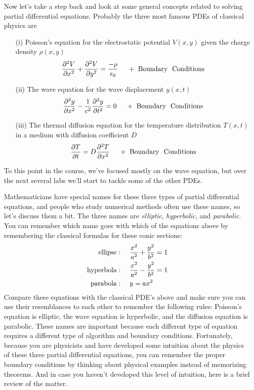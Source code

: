 Now let's take a step back and look at some general concepts
related to solving partial differential equations. Probably the
three most famous PDEs of classical physics are
\begin{enumerate}
  \item[(i)] Poisson's equation for the electrostatic potential $V(x,y)$ given the charge density
$\rho(x,y)$
\begin{equation}
    {\partial^2 V \over \partial x^2} +
    {\partial^2 V \over \partial y^2}
    = {-\rho \over \epsilon_0}
    ~~~~+~{\rm Boundary~~Conditions}
\end{equation}


\item[(ii)] The wave equation for the wave displacement $y(x,t)$
\begin{equation}
    {\partial^2 y \over \partial x^2} - {1 \over c^2}
    {\partial^2 y \over \partial t^2} =0
    ~~~~+~{\rm Boundary~~Conditions}
\end{equation}


\item[(iii)] The thermal diffusion equation for the temperature
    distribution $T(x,t)$ in a medium with diffusion coefficient $D$
\begin{equation}
    {\partial T \over \partial t} = D
    {\partial^2 T \over \partial x^2}
    ~~~~+~{\rm Boundary~~Conditions}
    \label{diffusion}
\end{equation}

\end{enumerate}
To this point in the course, we've focused mostly on the wave
equation, but over the next several labs we'll start to tackle
some of the other PDEs.

Mathematicians have special names for these three types of partial
differential equations, and people who study numerical methods often
use these names, so let's discuss them a bit. The three names are
{\it elliptic}, {\it hyperbolic}, and {\it parabolic}. You can
remember which name goes with which of the equations above by
remembering the classical formulas for these conic sections:
\begin{align}
    {\rm ellipse:~~~~}& {x^2 \over a^2} + {y^2 \over b^2}=1
    \\
    {\rm hyperbola:~~~~}& {x^2 \over a^2} - {y^2 \over b^2}=1
    \\
    {\rm parabola:~~~~}& y=a x^2
\end{align}
Compare these equations with the classical PDE's above and make sure
you can use their resemblances to each other to remember the
following rules: Poisson's equation is elliptic, the wave equation
is hyperbolic, and the diffusion equation is parabolic. These names
are important because each different type of equation requires a
different type of algorithm and boundary conditions. Fortunately,
because you are physicists and have developed some intuition about
the physics of these three partial differential equations, you can
remember the proper boundary conditions by thinking about physical
examples instead of memorizing theorems. And in case you haven't
developed this level of intuition, here is a brief review of the
matter.

